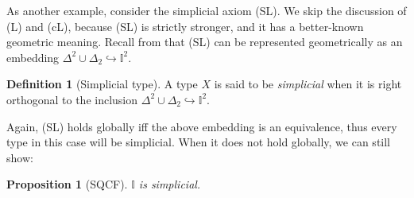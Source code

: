 \documentclass[a4paper,12pt]{amsart}
\newtheorem{proposition}[theorem]{Proposition}
\theoremstyle{definition}
\newtheorem{definition}[theorem]{Definition}
\newcommand{\mbb}[1]{\mathbb{#1}}
\newcommand{\I}{\mbb I}
\newcommand{\hook}{\hookrightarrow}
\begin{document}
As another example, consider the simplicial axiom (SL). We skip the discussion of (L) and (cL), because (SL) is strictly stronger, and it has a better-known geometric meaning. Recall from  that (SL) can be represented geometrically as an embedding $\Delta^2\cup\Delta_2 \hook \I^2$.

\begin{definition}[Simplicial type]
  A type $X$ is said to be \emph{simplicial} when it is right orthogonal to the inclusion $\Delta^2 \cup \Delta_2 \hook \I^2$.
\end{definition}

Again, (SL) holds globally iff the above embedding is an equivalence, thus every type in this case will be simplicial. When it does not hold globally, we can still show:

\begin{proposition}[SQCF]\label{specissimplicial}
  $\I$ is simplicial.
\end{proposition}
\end{document}
